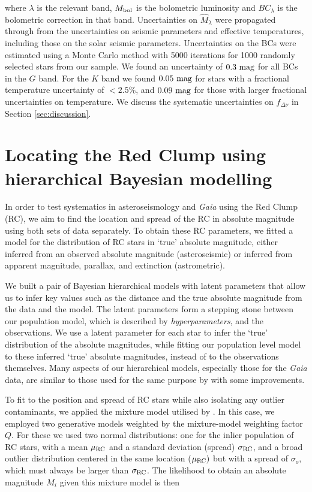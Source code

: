 \documentclass[fleqn,usenatbib]{mnras}
\newcommand{\fdnu}{\mbox{$f_{\Delta\nu}$}\xspace}
\newcommand{\gaia}{\emph{Gaia}\xspace}
\newcommand{\new}[1]{#1}
\newcommand{\nnew}[1]{#1}
\newcommand{\up}[1]{#1}
\begin{document}
\noindent where $\lambda$ is the relevant band, $M_{\rm bol}$ is the bolometric luminosity and $BC_\lambda$ is the bolometric correction in that band. Uncertainties on $\hat{M}_\lambda$ were propagated through from the uncertainties on seismic parameters and effective temperatures, including those on the solar seismic parameters. Uncertainties on the BCs were estimated using a Monte Carlo method with 5000 iterations for 1000 randomly selected stars from our sample. We found an uncertainty of $0.3\ \rm mag$ for all BCs in the $G$ band. For the $K$ band we found $0.05\ \rm mag$ for stars with a fractional temperature uncertainty of $< 2.5\%$, and $0.09\ \rm mag$ for those with larger fractional uncertainties on temperature. We discuss the systematic uncertainties on \fdnu in Section \ref{sec:discussion}.

\section{Locating the Red Clump using hierarchical Bayesian modelling} \label{sec:method}
In order to test systematics \up{in asteroseismology and \gaia} using the Red Clump (RC), \up{we aim to find the location and spread of the RC in absolute magnitude using both sets of data separately.} To obtain these RC parameters, we fitted a model for the distribution of RC stars in `true' absolute magnitude, either inferred from an observed absolute magnitude (asteroseismic) or inferred from apparent magnitude, parallax, and extinction (astrometric).

We \nnew{built a pair of} Bayesian hierarchical models with latent parameters that allow us to infer key values such as the distance and the true absolute magnitude from the data and the model. The latent parameters form a stepping stone between our population model, which is described by \textit{hyperparameters}, and the observations. We use a latent parameter for each star to infer the `true' distribution of the absolute magnitudes, while fitting our population level model to these inferred `true' absolute magnitudes, instead of to the observations themselves. Many aspects of our hierarchical models, especially those for the \gaia data, are similar to those used for the same purpose by  with some improvements.

To fit to the position and spread of RC stars while also isolating any outlier contaminants, we applied the mixture model \citep{art:hogg+2010} utilised by . In this case, we employed two generative models weighted by the mixture-model weighting factor $Q$. For these we used two normal distributions: one for the inlier population of RC stars, with a mean $\mu_{\rm RC}$ and a \new{standard deviation (spread)} $\sigma_{\rm RC}$, and a broad outlier distribution centered in the same location ($\mu_{\rm RC})$ but with a spread of $\sigma_o$, which must always be larger than $\sigma_{\rm RC}$. The likelihood to obtain an absolute magnitude $M_i$ given this mixture model is then
\end{document}
